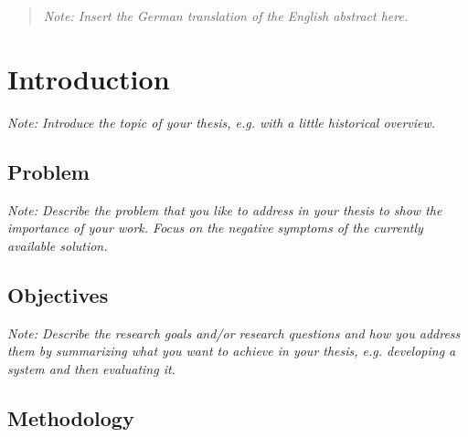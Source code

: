 \documentclass[a4paper,12pt,twoside]{report}
\begin{document}
\clearpage

\begin{abstract}

\textit{Note: Insert the German translation of the English abstract here.}

\end{abstract}

\clearpage



\tableofcontents
\clearpage

\clearpage

\begin{acronym}

\end{acronym}


\fancyhead{}
\pagestyle{fancy}
\fancyhead[LE]{\slshape \leftmark}
\fancyhead[RO]{\slshape \rightmark}
\headheight=15pt





\chapter{Introduction}

\textit{Note: Introduce the topic of your thesis, e.g. with a little historical overview.}

\section{Problem}

\textit{Note: Describe the problem that you like to address in your thesis to show the importance of your work. Focus on the negative symptoms of the currently available solution.}

\section{Objectives}

\textit{Note: Describe the research goals and/or research questions and how you address them by summarizing what you want to achieve in your thesis, e.g. developing a system and then evaluating it.}

\section{Methodology}
\end{document}
